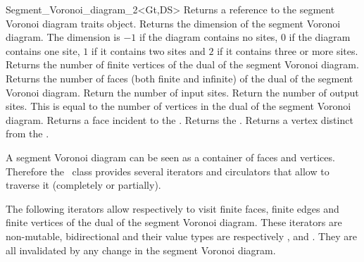 \begin{ccRefClass}{Segment_Voronoi_diagram_2<Gt,DS>}
\ccAccessFunctions
%
{Returns a reference to the segment Voronoi diagram traits object.}
\ccGlue
{}
{Returns the dimension of the segment Voronoi diagram. The dimension
  is $-1$ if the diagram contains no sites, $0$ if the diagram
  contains one site, $1$ if it contains two sites and $2$ if it
  contains three or more sites.}
\ccGlue
{}
{Returns the number of finite vertices of the dual of the segment
  Voronoi diagram.}
\ccGlue
{}
{Returns the number of faces (both finite and infinite) of the
  dual of the segment Voronoi diagram.}
\ccGlue
{}
{Return the number of input sites.}
\ccGlue
{}
{Return the number of output sites. This is equal to the number of
vertices in the dual of the segment Voronoi diagram.}
\ccGlue
{}
{Returns a face incident to the .}
\ccGlue
{}
{Returns the .}
\ccGlue
{}
{Returns a vertex distinct from  the .
}
\ccGlue
{}
\ccGlue
{}




A segment Voronoi diagram can be seen as a container of faces and
vertices. Therefore the \ccRefName\ class provides several iterators
and circulators that allow to traverse it (completely or partially).





The following iterators allow respectively to visit 
finite faces,  finite edges and  finite vertices of the dual of the
segment Voronoi diagram. These iterators are non-mutable,
bidirectional and their value types are respectively
,  and . 
They are all invalidated by any change in the segment Voronoi diagram.


\end{ccRefClass}
